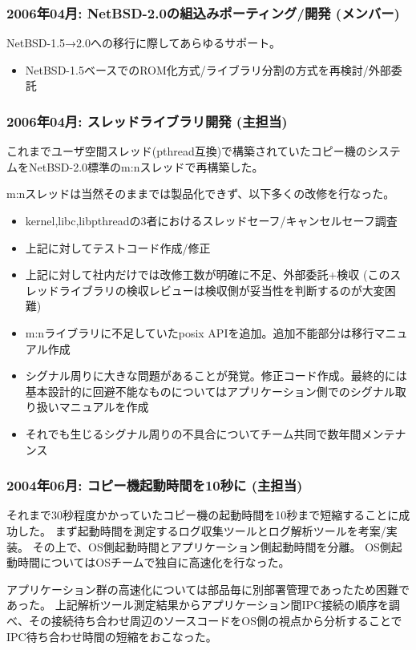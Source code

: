 \documentclass[letterpaper]{article}
\begin{document}
\subsubsection*{2006年04月: NetBSD-2.0の組込みポーティング/開発 (メンバー)}
NetBSD-1.5→2.0への移行に際してあらゆるサポート。

\begin{itemize}
  \item NetBSD-1.5ベースでのROM化方式/ライブラリ分割の方式を再検討/外部委託
\end{itemize}

\subsubsection*{2006年04月: スレッドライブラリ開発 (主担当)}
これまでユーザ空間スレッド(pthread互換)で構築されていたコピー機のシステムをNetBSD-2.0標準のm:nスレッドで再構築した。

m:nスレッドは当然そのままでは製品化できず、以下多くの改修を行なった。
\begin{itemize}
  \item kernel,libc,libpthreadの3者におけるスレッドセーフ/キャンセルセーフ調査
  \item 上記に対してテストコード作成/修正
  \item 上記に対して社内だけでは改修工数が明確に不足、外部委託+検収 (このスレッドライブラリの検収レビューは検収側が妥当性を判断するのが大変困難)
  \item m:nライブラリに不足していたposix APIを追加。追加不能部分は移行マニュアル作成
  \item シグナル周りに大きな問題があることが発覚。修正コード作成。最終的には基本設計的に回避不能なものについてはアプリケーション側でのシグナル取り扱いマニュアルを作成
  \item それでも生じるシグナル周りの不具合についてチーム共同で数年間メンテナンス
\end{itemize}

\subsubsection*{2004年06月: コピー機起動時間を10秒に (主担当)}
それまで30秒程度かかっていたコピー機の起動時間を10秒まで短縮することに成功した。
まず起動時間を測定するログ収集ツールとログ解析ツールを考案/実装。
その上で、OS側起動時間とアプリケーション側起動時間を分離。
OS側起動時間についてはOSチームで独自に高速化を行なった。

アプリケーション群の高速化については部品毎に別部署管理であったため困難であった。
上記解析ツール測定結果からアプリケーション間IPC接続の順序を調べ、その接続待ち合わせ周辺のソースコードをOS側の視点から分析することでIPC待ち合わせ時間の短縮をおこなった。
\end{document}
